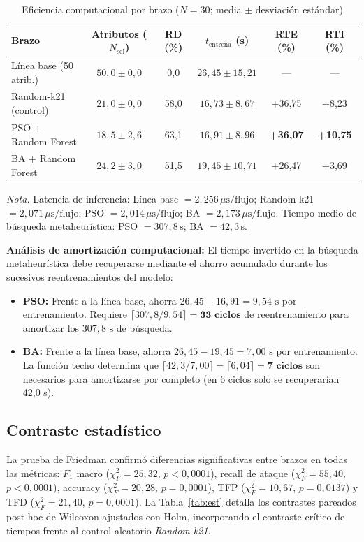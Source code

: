 \documentclass[11pt,a4paper]{article}
\newcommand{\tabfont}{\small\setstretch{1}}
\begin{document}
\begin{table}[ht]
\tabfont
\caption{Eficiencia computacional por brazo ($N = 30$; media $\pm$ desviación estándar)}
\label{tab:efic}
\begin{tabular}{@{}lccccc@{}}
\toprule
Brazo & Atributos ($N_{\text{sel}}$) & RD (\%) & $t_{\text{entrena}}$ (s) & RTE (\%) & RTI (\%) \\
\midrule
Línea base (50 atrib.) & $50{,}0 \pm 0{,}0$ & 0,0 & $26{,}45 \pm 15{,}21$ & — & — \\
Random-k21 (control)   & $21{,}0 \pm 0{,}0$ & 58,0 & $16{,}73 \pm 8{,}67$ & +36,75 & +8,23 \\
PSO + Random Forest    & $18{,}5 \pm 2{,}6$ & 63,1 & $16{,}91 \pm 8{,}96$ & \textbf{+36,07} & \textbf{+10,75} \\
BA + Random Forest     & $24{,}2 \pm 3{,}0$ & 51,5 & $19{,}45 \pm 10{,}71$ & +26,47 & +3,69 \\
\bottomrule
\end{tabular}

\smallskip
\footnotesize\emph{Nota.} Latencia de inferencia: Línea base $= 2{,}256\,\mu\text{s/flujo}$; Random-k21 $= 2{,}071\,\mu\text{s/flujo}$; PSO $= 2{,}014\,\mu\text{s/flujo}$; BA $= 2{,}173\,\mu\text{s/flujo}$. Tiempo medio de búsqueda metaheurística: PSO $= 307{,}8\,\text{s}$; BA $= 42{,}3\,\text{s}$.
\end{table}

\noindent\textbf{Análisis de amortización computacional:}
El tiempo invertido en la búsqueda metaheurística debe recuperarse mediante el ahorro acumulado durante los sucesivos reentrenamientos del modelo:
\begin{itemize}[leftmargin=1.5em,itemsep=1pt]
  \item \textbf{PSO:} Frente a la línea base, ahorra $26{,}45 - 16{,}91 = 9{,}54\text{ s}$ por entrenamiento. Requiere $\lceil 307{,}8 / 9{,}54 \rceil = \mathbf{33\text{ ciclos}}$ de reentrenamiento para amortizar los $307{,}8\text{ s}$ de búsqueda.
  \item \textbf{BA:} Frente a la línea base, ahorra $26{,}45 - 19{,}45 = 7{,}00\text{ s}$ por entrenamiento. La función techo determina que $\lceil 42{,}3 / 7{,}00 \rceil = \lceil 6{,}04 \rceil = \mathbf{7\text{ ciclos}}$ son necesarios para amortizarse por completo (en 6 ciclos solo se recuperarían 42,0 s).
\end{itemize}

\subsection{Contraste estadístico}
La prueba de Friedman confirmó diferencias significativas entre brazos en todas las métricas: $F_1$ macro ($\chi_F^2 = 25{,}32$, $p < 0{,}0001$), recall de ataque ($\chi_F^2 = 55{,}40$, $p < 0{,}0001$), accuracy ($\chi_F^2 = 20{,}28$, $p = 0{,}0001$), TFP ($\chi_F^2 = 10{,}67$, $p = 0{,}0137$) y TFD ($\chi_F^2 = 21{,}40$, $p = 0{,}0001$). La Tabla~\ref{tab:est} detalla los contrastes pareados post-hoc de Wilcoxon ajustados con Holm, incorporando el contraste crítico de tiempos frente al control aleatorio \emph{Random-k21}.
\end{document}
